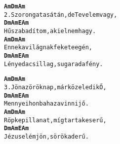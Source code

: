\newpage
{}
\kottastart
{}
\kottaend
\begin{minipage}{\textwidth}
\begin{multicols}{2}
\begin{minipage}{\textwidth}
\begin{alltt}
\textbf{     Am                Dm          Am}
2. Szorongat a sátán, de Te velem vagy,
\textbf{    Dm      Am    E           Am}
   Hű szabadítom, aki el nem hagy.
\textbf{   Am                Dm      Am}
   Ennek a világnak fekete egén,
\textbf{    Dm        Am      E         Am}
   Lényed a csillag, sugarad a fény.
\end{alltt}
\vspace{0.0cm}
\versszakspacing
\end{minipage}
\begin{minipage}{\textwidth}
\begin{alltt}
\textbf{    Am                   Dm       Am}
3. Jön az örök nap, már közeledik Ő,
\textbf{    Dm      Am    E         Am}
   Mennyei honba hazavinni jő.
\textbf{    Am                  Dm         Am}
   Röpke pillanat, míg tart a keserű,
\textbf{    Dm     Am        E         Am}
   Jézus elém jön, s örök a derű.
\end{alltt}
\vspace{0.0cm}
\versszakspacing
\end{minipage}
\vspace{0.2cm}
\end{multicols}
\end{minipage}

